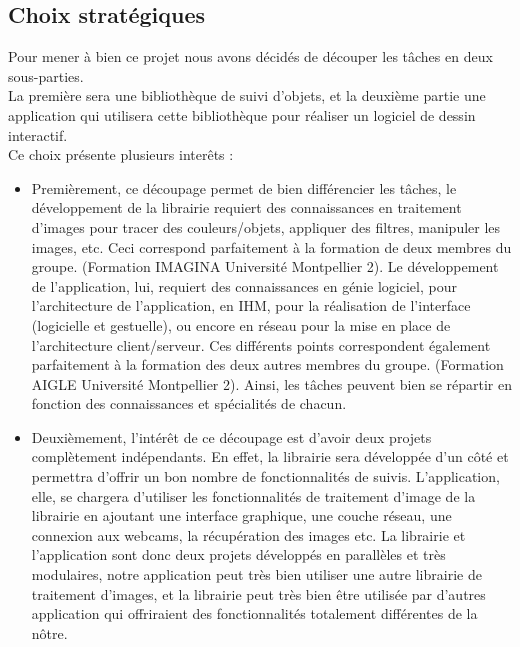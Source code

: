 \documentclass{report}
\begin{document}
			\subsection{Choix stratégiques}
			Pour mener à bien ce projet nous avons décidés de découper les tâches en deux sous-parties. \\
			La première sera une bibliothèque de suivi d'objets, et la deuxième partie une application qui utilisera
			cette bibliothèque pour réaliser un logiciel de dessin interactif. \\
			Ce choix présente plusieurs interêts : \\
			\begin{itemize}
				\item{Premièrement, ce découpage permet de bien différencier les tâches, le développement de la librairie requiert des connaissances en traitement d'images pour tracer des couleurs/objets, appliquer des filtres, manipuler les images, etc. Ceci correspond parfaitement à la formation de deux membres du groupe. (Formation IMAGINA Université Montpellier 2). 
				Le développement de l'application, lui, requiert des connaissances en génie logiciel, pour l'architecture de l'application, en IHM, pour la réalisation de l'interface (logicielle et gestuelle), ou encore en réseau pour la mise en place de l'architecture client/serveur. 
				Ces différents points correspondent également parfaitement à la formation des deux autres membres du groupe. (Formation AIGLE Université Montpellier 2). Ainsi, les tâches peuvent bien se répartir en fonction des connaissances et spécialités de chacun.} \\
				\item{Deuxièmement, l'intérêt de ce découpage est d'avoir deux projets complètement indépendants. En effet, la librairie sera développée d'un côté et permettra d'offrir un bon nombre de fonctionnalités de suivis. 
				L'application, elle, se chargera d'utiliser les fonctionnalités de traitement d'image de la librairie en ajoutant une interface graphique, une couche réseau, une connexion aux webcams, la récupération des images etc.
				La librairie et l'application sont donc deux projets développés en parallèles et très modulaires, notre application peut très bien utiliser une autre librairie de traitement d'images, et la librairie peut très bien être utilisée par d'autres application qui offriraient des fonctionnalités totalement différentes de la nôtre.}
			\end{itemize}
			\newpage
\end{document}
